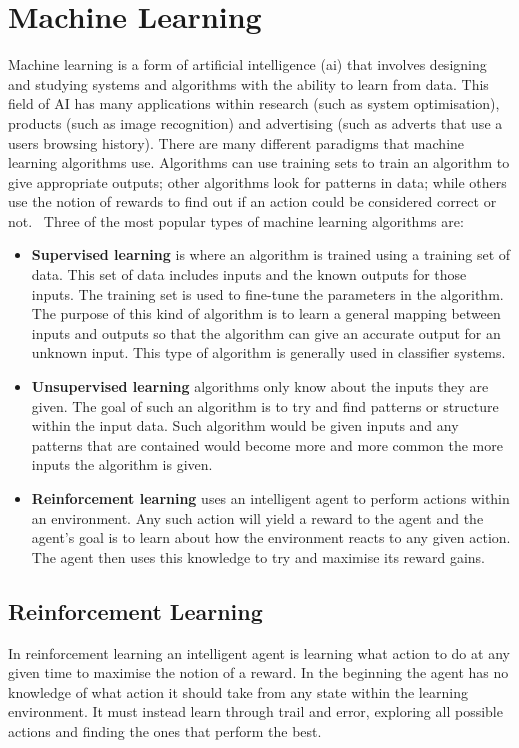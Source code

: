 \chapter{Machine Learning}\label{machine learning}
Machine learning is a form of artificial intelligence (\ac{ai}) that involves designing and studying systems and algorithms with the ability to learn from data. This field of AI has many applications within research (such as system optimisation), products (such as image recognition) and advertising (such as adverts that use a users browsing history). There are many different paradigms that machine learning algorithms use. Algorithms can use training sets to train an algorithm to give appropriate outputs; other algorithms look for patterns in data; while others use the notion of rewards to find out if an action could be considered correct or not.~\cite{alpaydin2010introduction} Three of the most popular types of machine learning algorithms are:

\begin{itemize}
  \item \textbf{Supervised learning} is where an algorithm is trained using a training set of data. This set of data includes inputs and the known outputs for those inputs. The training set is used to fine-tune the parameters in the algorithm. The purpose of this kind of algorithm is to learn a general mapping between inputs and outputs so that the algorithm can give an accurate output for an unknown input. This type of algorithm is generally used in classifier systems.
  \item \textbf{Unsupervised learning} algorithms only know about the inputs they are given. The goal of such an algorithm is to try and find patterns or structure within the input data. Such algorithm would be given inputs and any patterns that are contained would become more and more common the more inputs the algorithm is given.
  \item \textbf{Reinforcement learning} uses an intelligent agent to perform actions within an environment. Any such action will yield a reward to the agent and the agent’s goal is to learn about how the environment reacts to any given action. The agent then uses this knowledge to try and maximise its reward gains.
\end{itemize}
\section{Reinforcement Learning}\label{reinforcement learning}
In reinforcement learning an intelligent agent is learning what action to do at any given time to maximise the notion of a reward. In the beginning the agent has no knowledge of what action it should take from any state within the learning environment. It must instead learn through trail and error, exploring all possible actions and finding the ones that perform the best.

